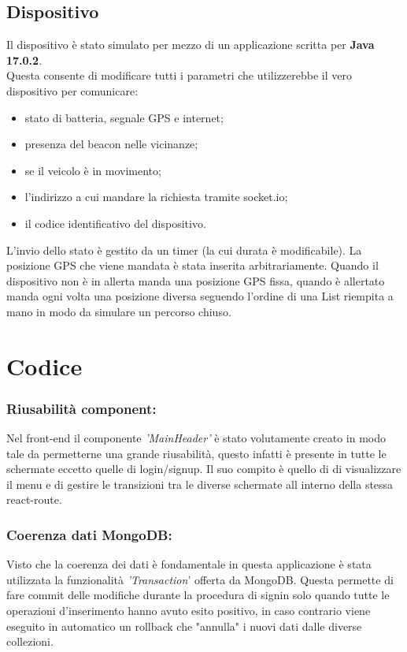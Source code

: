 \documentclass{report}
\begin{document}
\subsection{Dispositivo}
Il dispositivo è stato simulato per mezzo di un applicazione scritta per \textbf{Java 17.0.2}.\\
Questa consente di modificare tutti i parametri che utilizzerebbe il vero dispositivo per comunicare:
\begin{itemize}
    \item stato di batteria, segnale GPS e internet;
    \item presenza del beacon nelle vicinanze;
    \item se il veicolo è in movimento;
    \item l'indirizzo a cui mandare la richiesta tramite socket.io;
    \item il codice identificativo del dispositivo.
\end{itemize}
L'invio dello stato è gestito da un timer (la cui durata è modificabile). La posizione GPS che viene mandata è stata inserita arbitrariamente. Quando il dispositivo non è in allerta manda una posizione GPS fissa, quando è allertato manda ogni volta una posizione diversa seguendo l'ordine di una List riempita a mano in modo da simulare un percorso chiuso.

\section{Codice}
\subsubsection{Riusabilità component:}
Nel front-end il componente \textit{'MainHeader'} è stato volutamente creato in modo tale da permetterne una grande riusabilità, questo infatti è presente in tutte le schermate eccetto quelle di login/signup. Il suo compito è quello di di visualizzare il menu e di gestire le transizioni tra le diverse schermate all interno della stessa react-route.\\
\subsubsection{Coerenza dati MongoDB:}
Visto che la coerenza dei dati è fondamentale in questa applicazione è stata utilizzata la funzionalità \textit{'Transaction}' offerta da MongoDB. Questa permette di fare commit delle modifiche durante la procedura di signin solo quando tutte le operazioni d'inserimento hanno avuto esito positivo, in caso contrario viene eseguito in automatico un rollback che "annulla" i nuovi dati dalle diverse collezioni.\\
\end{document}
